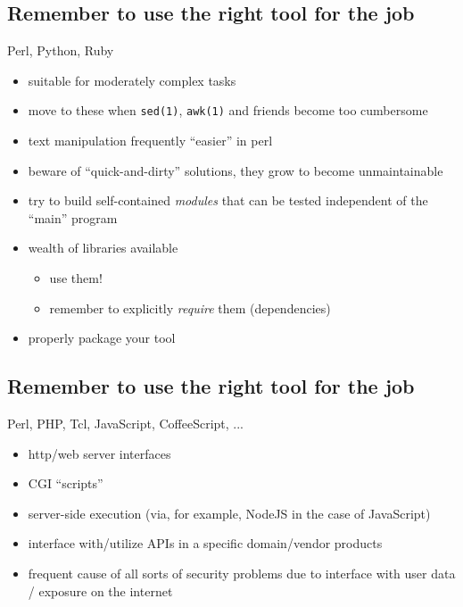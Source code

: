 \documentclass[xga]{xdvislides}
\begin{document}
\subsection{Remember to use the right tool for the job}
Perl, Python, Ruby
\begin{itemize}
	\item suitable for moderately complex tasks
	\item move to these when {\tt sed(1)}, {\tt awk(1)} and friends
		become too cumbersome
	\item text manipulation frequently ``easier'' in perl
	\item beware of ``quick-and-dirty'' solutions, they grow to become
		unmaintainable
	\item try to build self-contained {\em modules} that can be tested
		independent of the ``main'' program
	\item wealth of libraries available
		\begin{itemize}
			\item use them!
			\item remember to explicitly {\em require} them
				(dependencies)
		\end{itemize}
	\item properly package your tool
\end{itemize}

\subsection{Remember to use the right tool for the job}
Perl, PHP, Tcl, JavaScript, CoffeeScript, ...
\begin{itemize}
	\item http/web server interfaces
	\item CGI ``scripts''
	\item server-side execution (via, for example, NodeJS in the case
		of JavaScript)
	\item interface with/utilize APIs in a specific domain/vendor products
	\item frequent cause of all sorts of security problems due to
		interface with user data / exposure on the internet
\end{itemize}
\end{document}
